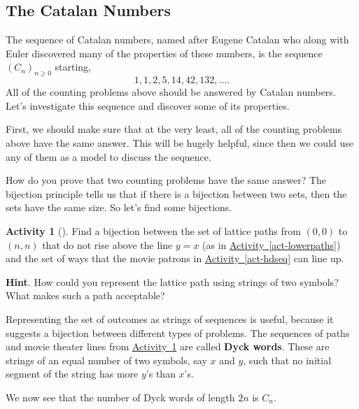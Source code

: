 \documentclass[10pt,]{book}
\newcommand{\terminology}[1]{\textbf{#1}}
\theoremstyle{plain}
\theoremstyle{definition}
\theoremstyle{definition}
\theoremstyle{definition}
\newtheorem{activity}[project]{Activity}
\numberwithin{equation}{chapter}
\begin{document}
\subsection[{The Catalan Numbers}]{The Catalan Numbers}\label{subsec-catalanseq}
\hypertarget{p-1007}{}%
The sequence of Catalan numbers, named after Eugene Catalan who along with Euler discovered many of the properties of these numbers, is the sequence \((C_n)_{n \ge 0}\) starting,%
\begin{equation*}
1, 1, 2, 5, 14, 42, 132, \ldots\text{.}
\end{equation*}
All of the counting problems above should be answered by Catalan numbers.  Let's investigate this sequence and discover some of its properties.%
\par
\hypertarget{p-1008}{}%
First, we should make sure that at the very least, all of the counting problems above have the same answer.  This will be hugely helpful, since then we could use any of them as a model to discuss the sequence.%
\par
\hypertarget{p-1009}{}%
How do you prove that two counting problems have the same answer?  The bijection principle tells us that if there is a bijection between two sets, then the sets have the same size.  So let's find some bijections.%
\begin{activity}[]\label{act-pathshdseq}
\hypertarget{p-1010}{}%
Find a bijection between the set of lattice paths from \((0,0)\) to \((n,n)\) that do not rise above the line \(y = x\) (as in \hyperref[act-lowerpaths]{Activity~\ref{act-lowerpaths}}) and the set of ways that the movie patrons in \hyperref[act-hdseq]{Activity~\ref{act-hdseq}} can line up.%
\par\smallskip%
\noindent\textbf{Hint}.\hypertarget{hint-117}{}\quad%
\hypertarget{p-1011}{}%
How could you represent the lattice path using strings of two symbols?  What makes such a path acceptable?%
\end{activity}
\hypertarget{p-1012}{}%
Representing the set of outcomes as strings of sequences is useful, because it suggests a bijection between different types of problems.  The sequences of paths and movie theater lines from \hyperref[act-pathshdseq]{Activity~\ref{act-pathshdseq}} are called \terminology{Dyck words}.  These are strings of an equal number of two symbols, say \(x\) and \(y\), such that no initial segment of the string has more \(y\)'s than \(x\)'s.%
\par
\hypertarget{p-1013}{}%
We now see that the number of Dyck words of length \(2n\) is \(C_n\).%
\end{document}

